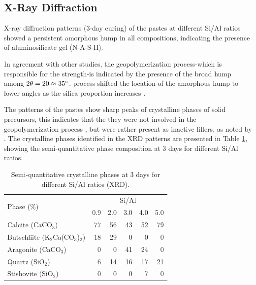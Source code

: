 \subsection{X-Ray Diffraction}

X-ray diffraction patterns (3-day curing) of the pastes at different Si/Al ratios showed a persistent amorphous hump in all compositions, indicating the presence of aluminosilicate gel (N-A-S-H).

In agreement with other studies, the geopolymerization process-which is responsible for the strength-is indicated by the presence of the broad hump among $2\theta = 20 \approx 35^{\circ}$.
process shifted the location of the amorphous hump to lower angles as the silica proportion increases \cite{arellano2014geopolymer,lee2017strength, wan2017geopolymerization}.

The patterns of the pastes show sharp peaks of crystalline phases of solid precursors, this indicates that the they were not involved in the geopolymerization process \cite{Geraldo2020}, but were rather present as inactive fillers, as noted by \cite{ruiz2012alkaline}.
The crystalline phases identified in the XRD patterns are presented in Table \ref{tab:xrd_phases_pastes}, showing the semi-quantitative phase composition at 3 days for different Si/Al ratios.

\begin{table}[H]
    \centering
    \caption{Semi-quantitative crystalline phases at 3 days for different Si/Al ratios (XRD).}
    \label{tab:xrd_phases_pastes}
    \begin{tabular}{lrrrrr}
        \hline
        \multirow{2}{*}{Phase (\%)} &
        \multicolumn{5}{c}{Si/Al}\\
        \cline{2-6}
        & 0.9 & 2.0 & 3.0 & 4.0 & 5.0 \\
        \hline
        Calcite (CaCO$_3$) & 77 & 56 & 43 & 52 & 79 \\
        Butschliite (K$_2$Ca(CO$_3$)$_2$) & 18 & 29 & 0 & 0 & 0 \\
        Aragonite (CaCO$_3$) & 0 & 0 & 41 & 24 & 0 \\
        Quartz (SiO$_2$) & 6 & 14 & 16 & 17 & 21 \\
        Stishovite (SiO$_2$) & 0 & 0 & 0 & 7 & 0 \\
        \hline
    \end{tabular}
\end{table}

